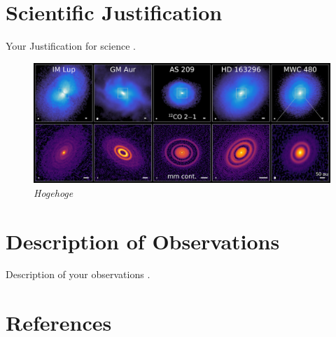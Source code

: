 \documentclass[12pt,a4paper]{article}  %
\begin{document}
\pagestyle{plain}
 



\section{Scientific Justification}
Your Justification for science \citep{Yamato22}.

\begin{figure}[h]
    \centering
    \includegraphics[width=0.8\hsize]{MAPS_disks.png}
    \caption{\em{Hogehoge}}
    \label{fig:MAPS_disks}
\end{figure}

\section{Description of Observations}
Description of your observations \citep{Yamato23}.




\section*{References}


\end{document}
